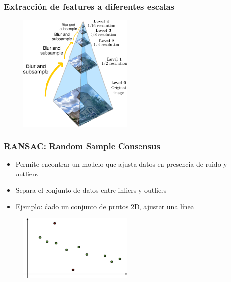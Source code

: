 \begin{frame}
	\frametitle{Extracción de features a diferentes escalas}
	
	\begin{figure}
		\includegraphics[width=0.5\textwidth]{./images/image_pyramid.pdf}
	\end{figure}

\end{frame}

\begin{frame}
	\frametitle{RANSAC: Random Sample Consensus}
	\footnotesize
	
	\begin{itemize}
		\item Permite encontrar un modelo que ajusta datos en presencia de ruido y outliers
		\item Separa el conjunto de datos entre inliers y outliers
		\item Ejemplo: dado un conjunto de puntos 2D, ajustar una línea 
	\end{itemize}
	
	\begin{figure}
		\includegraphics[width=0.5\textwidth]{./images/ransac1.pdf}
	\end{figure}
	
\end{frame}


